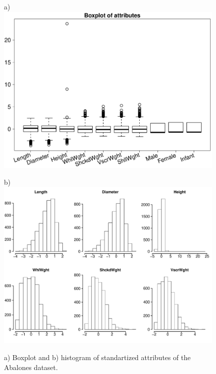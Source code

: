 \documentclass[10pt, paper=a4]{article}
\begin{document}
\begin{figure}[h!]
  \begin{minipage}{0.49\textwidth}
    a)\\
    \includegraphics[width = 0.99\textwidth]{data_boxplot.pdf}
  \end{minipage} \hfill
  \begin{minipage}{0.49\textwidth}
    b)\\
    \includegraphics[width = 0.99\textwidth]{data_histogram.pdf}
  \end{minipage} \vfill
  \caption{a) Boxplot and b) histogram of standartized attributes of the
    Abalones dataset.}
  \label{fig:data_descriptive_analysis}
\end{figure}
\end{document}
